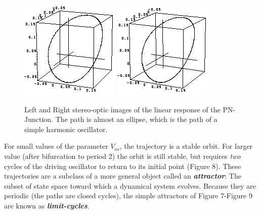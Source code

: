 \documentclass{../lab}
\begin{document}
\begin{figure}
    \centering
    \href{http://experimentationlab.berkeley.edu/sites/default/files/images/Nldimage042.gif}{\includegraphics[width=0.33\linewidth,keepaspectratio]{images/Nldimage042.png}}
    \href{http://experimentationlab.berkeley.edu/sites/default/files/images/Nldimage043.gif}{\includegraphics[width=0.33\linewidth,keepaspectratio]{images/Nldimage043.png}}
    \caption{Left and Right stereo-optic images of the linear response of the PN-Junction. The path is almost an ellipse, which is the path of a simple harmonic oscillator.}
    \label{fig:my_label}
\end{figure}

\newpage

For small values of the parameter $V_{os}$, the trajectory is a stable orbit. For larger value (after bifurcation to period 2) the orbit is still stable, but requires \emph{two} cycles of the driving oscillator to return to its initial point (Figure 8). These trajectories are a subclass of a more general object called an \emph{\textbf{attractor}}: The subset of state space toward which a dynamical system evolves. Because they are periodic (the paths are closed cycles), the simple attractors of Figure 7-Figure 9 are known as \emph{\textbf{limit-cycles}}.
\end{document}
